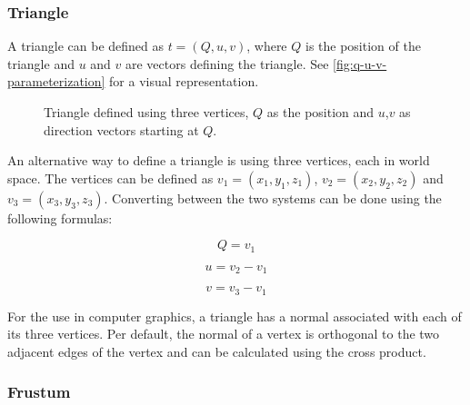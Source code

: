 \subsubsection{Triangle}

A triangle can be defined as $t = (Q, u, v)$, where $Q$ is the position of the triangle and $u$ and $v$ are vectors defining the triangle. See \autoref{fig:q-u-v-parameterization} for a visual representation.

\begin{figure}[H]
  \centering
  \caption{Triangle defined using three vertices, $Q$ as the position and $u$,$v$ as direction vectors starting at $Q$.}
  \label{fig:q-u-v-parameterization}
\end{figure}

An alternative way to define a triangle is using three vertices, each in world space. The vertices can be defined as $v_1 = (x_1, y_1, z_1)$, $v_2 = (x_2, y_2, z_2)$ and $v_3 = (x_3, y_3, z_3)$. Converting between the two systems can be done using the following formulas:

\begin{equation}
  \label{eqn:triangle-vertices-to-q-u-v}
  Q = v_1
\end{equation}

\begin{equation}
  \label{eqn:triangle-vertices-to-q-u-v1}
  u = v_2 - v_1
\end{equation}

\begin{equation}
  \label{eqn:triangle-vertices-to-q-u-v2}
  v = v_3 - v_1
\end{equation}

For the use in computer graphics, a triangle has a normal associated with each of its three vertices. Per default, the normal of a vertex is orthogonal to the two adjacent edges of the vertex and can be calculated using the cross product.

\subsubsection{Frustum}

